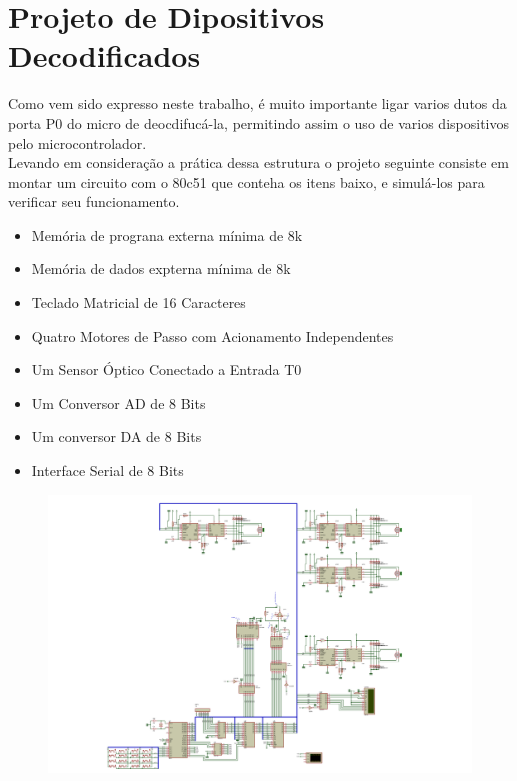 \documentclass{Fabiano_file}
\begin{document}
{\section{Projeto de Dipositivos Decodificados}
Como vem sido expresso neste trabalho, é muito importante ligar varios dutos da porta P0 do micro de deocdifucá-la, permitindo
assim o uso de varios dispositivos pelo microcontrolador.\\
Levando em consideração a prática dessa estrutura o projeto seguinte consiste em montar um circuito com o 80c51  que conteha os itens baixo,
e simulá-los para verificar seu funcionamento.\\

\begin{itemize}
 \item Memória de prograna externa mínima de 8k
 \item Memória de dados expterna mínima de 8k
 \item Teclado Matricial de 16 Caracteres
 \item Quatro Motores de Passo com Acionamento Independentes
 \item Um Sensor Óptico Conectado a Entrada T0
 \item Um Conversor AD de 8 Bits
 \item Um conversor DA de 8 Bits
 \item Interface Serial de 8 Bits
\end{itemize}

	\newpage
	\clearpage
	\begin{figure}
		\centering
		\includegraphics[width=1\linewidth]{projeto_final.pdf}
		\label{fig:projeto_final}
	\end{figure}
	\clearpage
	\newpage

}
\end{document}

